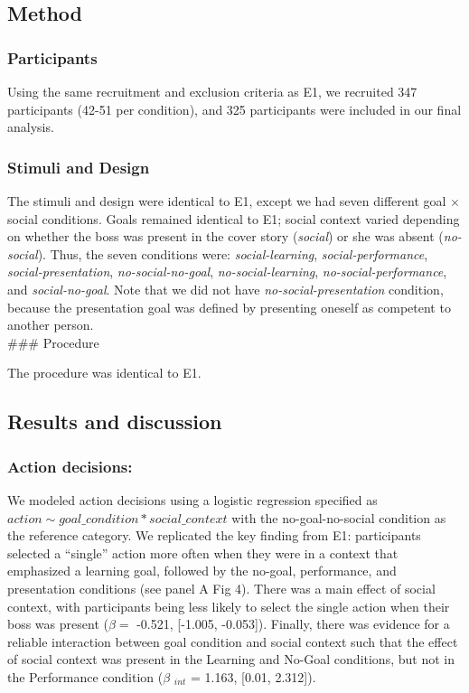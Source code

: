 \documentclass[10pt, letterpaper]{article}
\begin{document}
\subsection{Method}\label{method-1}

\subsubsection{Participants}\label{participants-1}

Using the same recruitment and exclusion criteria as E1, we recruited
347 participants (42-51 per condition), and 325 participants were
included in our final analysis.

\subsubsection{Stimuli and Design}\label{stimuli-and-design-1}

The stimuli and design were identical to E1, except we had seven
different goal \(\times\) social conditions. Goals remained identical to
E1; social context varied depending on whether the boss was present in
the cover story (\emph{social}) or she was absent (\emph{no-social}).
Thus, the seven conditions were: \emph{social-learning},
\emph{social-performance}, \emph{social-presentation},
\emph{no-social-no-goal}, \emph{no-social-learning},
\emph{no-social-performance}, and \emph{social-no-goal}. Note that we
did not have \emph{no-social-presentation} condition, because the
presentation goal was defined by presenting oneself as competent to
another person.\\
\#\#\# Procedure

The procedure was identical to E1.

\subsection{Results and discussion}\label{results-and-discussion-1}

\subsubsection{Action decisions:}\label{action-decisions-1}

We modeled action decisions using a logistic regression specified as
\texttt{$action \sim goal\_condition * social\_context$} with the
no-goal-no-social condition as the reference category. We replicated the
key finding from E1: participants selected a ``single'' action more
often when they were in a context that emphasized a learning goal,
followed by the no-goal, performance, and presentation conditions (see
panel A Fig 4). There was a main effect of social context, with
participants being less likely to select the single action when their
boss was present (\(\beta =\) -0.521, {[}-1.005, -0.053{]}). Finally,
there was evidence for a reliable interaction between goal condition and
social context such that the effect of social context was present in the
Learning and No-Goal conditions, but not in the Performance condition
(\(\beta\) \(_{int}\) = 1.163, {[}0.01, 2.312{]}).
\end{document}
